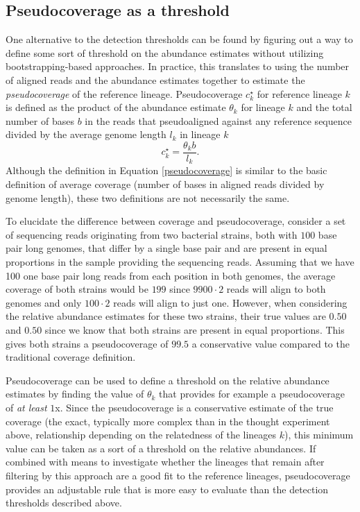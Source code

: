 \documentclass[officiallayout]{tktla}
\begin{document}
\subsection{Pseudocoverage as a threshold}

One alternative to the detection thresholds can be found by figuring
out a way to define some sort of threshold on the abundance estimates
without utilizing bootstrapping-based approaches. In practice, this
translates to using the number of aligned reads and the abundance
estimates together to estimate the \textit{pseudocoverage} of the
reference lineage. Pseudocoverage $c^{\star}_{k}$ for reference
lineage $k$ is defined as the product of the abundance estimate
$\theta_{k}$ for lineage $k$ and the total number of bases $b$ in the
reads that pseudoaligned against any reference sequence divided by the
average genome length $l_{k}$ in lineage $k$
\begin{equation}
  \label{pseudocoverage}
  c_{k}^{\star} = \frac{\theta_{k}b}{l_{k}}.
\end{equation}
Although the definition in Equation \ref{pseudocoverage} is similar to
the basic definition of average coverage (number of bases in aligned
reads divided by genome length), these two definitions are not
necessarily the same.

To elucidate the difference between coverage and pseudocoverage,
consider a set of sequencing reads originating from two bacterial
strains, both with $100$ base pair long genomes, that differ by a
single base pair and are present in equal proportions in the sample
providing the sequencing reads. Assuming that we have 100 one base
pair long reads from each position in both genomes, the average
coverage of both strains would be $199$ since $9900\cdot2$ reads
will align to both genomes and only $100\cdot2$ reads will align to
just one. However, when considering the relative abundance estimates
for these two strains, their true values are $0.50$ and $0.50$ since
we know that both strains are present in equal proportions. This gives
both strains a pseudocoverage of $99.5$ \textemdash a conservative
value compared to the traditional coverage definition.

Pseudocoverage can be used to define a threshold on the relative
abundance estimates by finding the value of $\theta_{k}$ that provides
for example a pseudocoverage of \textit{at least} $1$x. Since the
pseudocoverage is a conservative estimate of the true coverage (the
exact, typically more complex than in the thought experiment above,
relationship depending on the relatedness of the lineages $k$), this
minimum value can be taken as a sort of a threshold on the relative
abundances. If combined with means to investigate whether the lineages
that remain after filtering by this approach are a good fit to the
reference lineages, pseudocoverage provides an adjustable rule that is
more easy to evaluate than the detection thresholds described above.
\end{document}
